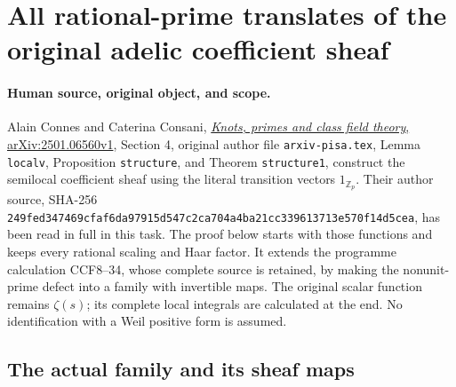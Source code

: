 \section{All rational-prime translates of the original adelic coefficient sheaf}
\label{sec:cc-divisor-coefficients}

\paragraph{Human source, original object, and scope.}
Alain Connes and Caterina Consani,
\href{https://arxiv.org/abs/2501.06560v1}{\emph{Knots, primes and class
field theory}, arXiv:2501.06560v1}, Section 4, original author file
\texttt{arxiv-pisa.tex}, Lemma \texttt{localv}, Proposition
\texttt{structure}, and Theorem \texttt{structure1}, construct the
semilocal coefficient sheaf using the literal transition vectors
$1_{\mathbb Z_p}$. Their author source, SHA-256
\texttt{249fed347469cfaf6da97915d547c2ca704a4ba21cc339613713e570f14d5cea},
has been read in full in this task. The proof below starts with those
functions and keeps every rational scaling and Haar factor. It extends
the programme calculation CCF8--34, whose complete source is retained,
by making the nonunit-prime defect into a family with invertible maps.
The original scalar function remains $\zeta(s)$; its complete local
integrals are calculated at the end. No identification with a Weil
positive form is assumed.

\subsection{The actual family and its sheaf maps}

